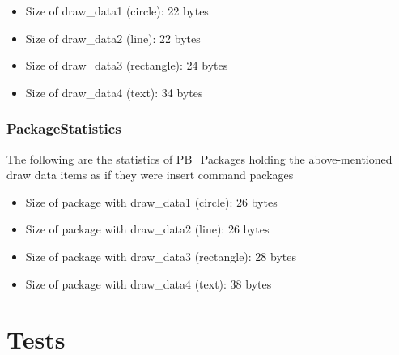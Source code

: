 \documentclass[12pt, a4paper]{report}
\begin{document}
\begin{itemize}
    \item Size of draw\_data1 (circle): 22 bytes
    \item Size of draw\_data2 (line): 22 bytes
    \item Size of draw\_data3 (rectangle): 24 bytes
    \item Size of draw\_data4 (text): 34 bytes
\end{itemize}

\subsubsection{PackageStatistics}
The following are the statistics of PB\_Packages holding the above-mentioned draw data items as if they were insert command packages 


\begin{itemize}
    \item Size of package with draw\_data1 (circle): 26 bytes
    \item Size of package with draw\_data2 (line): 26 bytes
    \item Size of package with draw\_data3 (rectangle): 28 bytes
    \item Size of package with draw\_data4 (text): 38 bytes
\end{itemize}

\newpage
\section{Tests}
\end{document}
